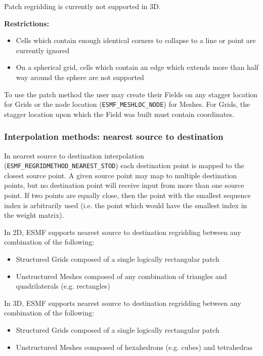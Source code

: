 \smallskip

 Patch regridding is currently not supported in 3D.

\smallskip

{\bf Restrictions:}
 \begin{itemize}
 \item Cells which contain enough identical corners to collapse to a line or point are currently ignored
 \item On a spherical grid, cells which contain an edge which extends more than half way around the sphere are not supported 
 \end{itemize}

 To use the patch method the user may create their Fields on any stagger location for Grids or the node location ({\tt ESMF\_MESHLOC\_NODE}) for Meshes.
 For Grids, the stagger location upon which the Field was built must contain coordinates. 


\subsubsection{Interpolation methods: nearest source to destination}\label{sec:interpolation:neareststod}
In nearest source to destination interpolation ({\tt ESMF\_REGRIDMETHOD\_NEAREST\_STOD}) each destination point is mapped to the closest source point. A given source point may map to multiple destination points, but no destination point will receive input from more than one source point. If two points are equally close, then the point with the smallest sequence index is arbitrarily used (i.e. the point which would have the smallest index in the weight matrix). 

\smallskip

 In 2D, ESMF supports nearest source to destination regridding between any combination of the following:
 \begin{itemize}
 \item Structured Grids composed of a single logically rectangular patch
 \item Unstructured Meshes composed of any combination of triangles and quadrilaterals (e.g. rectangles)
 \end{itemize}

\smallskip

 In 3D, ESMF supports nearest source to destination regridding between any combination of the following:
 \begin{itemize}
 \item Structured Grids composed of a single logically rectangular patch
 \item Unstructured Meshes composed of hexahedrons (e.g. cubes) and tetrahedras
 \end{itemize}

